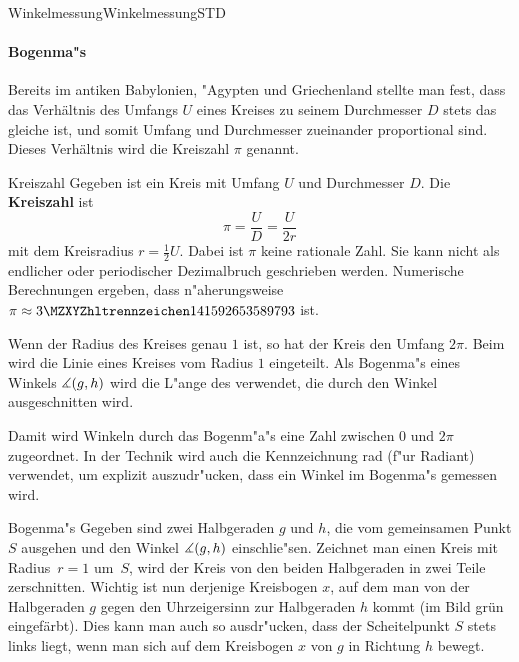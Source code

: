 \begin{MXContent}{Winkelmessung}{Winkelmessung}{STD}
\paragraph{Bogenma"s}
Bereits im antiken Babylonien, "Agypten und Griechenland stellte man fest, 
dass das Verh\"altnis des Umfangs $U$ eines Kreises zu seinem Durchmesser 
$D$ stets das gleiche ist, und somit Umfang und Durchmesser zueinander 
proportional sind.
Dieses Verh\"altnis wird die Kreiszahl $\pi$ genannt. 
\begin{MXInfo}{Kreiszahl}%
Gegeben ist ein Kreis mit Umfang $U$ und Durchmesser $D$.
Die \textbf{Kreiszahl} ist
\[
\pi = \frac{U}{D} = \frac{U}{2r} %
\]
mit dem Kreisradius $r = \frac{1}{2} U$.
Dabei ist $\pi$ keine rationale Zahl. Sie kann nicht als endlicher oder 
periodischer Dezimalbruch geschrieben werden. Numerische Berechnungen ergeben,
dass n"aherungsweise $\pi \approx \MZahl{3}{141592653589793}$ ist.
\end{MXInfo}

Wenn der Radius des Kreises genau $1$ ist, so hat der Kreis den Umfang $2\pi$. 
Beim  wird die Linie eines Kreises vom Radius $1$
eingeteilt.
Als Bogenma"s eines Winkels $\measuredangle(g,h)$ wird die L"ange des 
 verwendet, die durch den Winkel 
{\glqq}ausgeschnitten{\grqq} wird.

Damit wird Winkeln durch das Bogenm"a"s eine Zahl zwischen $0$ und $2\pi$ 
zugeordnet. In der Technik wird auch die Kennzeichnung rad (f"ur Radiant)
verwendet, um explizit auszudr"ucken, dass ein Winkel im Bogenma"s gemessen
wird.

\begin{MXInfo}{Bogenma"s}%
Gegeben sind zwei Halbgeraden $g$ und $h$, die vom gemeinsamen Punkt $S$
ausgehen und den Winkel $\measuredangle(g,h)$ einschlie"sen.
Zeichnet man einen Kreis mit Radius~$r = 1$ um~$S$, wird der Kreis von den 
beiden Halbgeraden in zwei Teile zerschnitten. Wichtig ist nun derjenige 
Kreisbogen $x$, auf dem man von der Halbgeraden $g$ gegen den Uhrzeigersinn 
zur Halbgeraden $h$ kommt (im Bild gr\"un eingef\"arbt). Dies kann man auch 
so ausdr"ucken, dass der Scheitelpunkt $S$ stets links liegt, 
wenn man sich auf dem Kreisbogen $x$ von $g$ in Richtung $h$ bewegt.


\end{MXInfo}
\end{MXContent}
